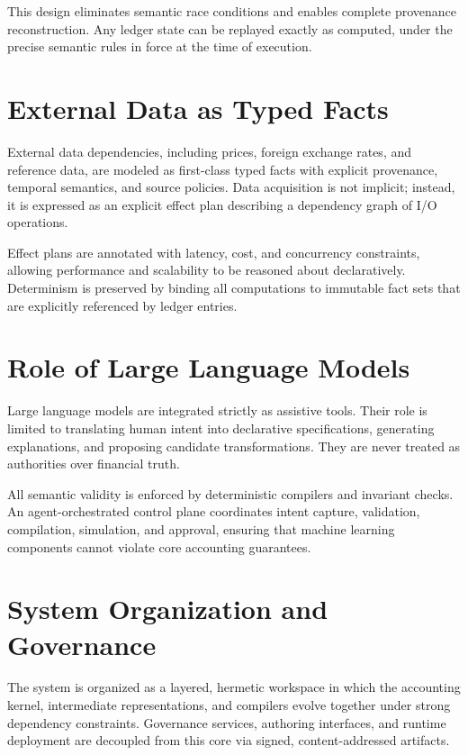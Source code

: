 \documentclass[11pt]{article}
\begin{document}
This design eliminates semantic race conditions and enables complete provenance
reconstruction. Any ledger state can be replayed exactly as computed, under the precise
semantic rules in force at the time of execution.

\section{External Data as Typed Facts}

External data dependencies, including prices, foreign exchange rates, and reference
data, are modeled as first-class typed facts with explicit provenance, temporal
semantics, and source policies. Data acquisition is not implicit; instead, it is
expressed as an explicit effect plan describing a dependency graph of I/O operations.

Effect plans are annotated with latency, cost, and concurrency constraints, allowing
performance and scalability to be reasoned about declaratively. Determinism is preserved
by binding all computations to immutable fact sets that are explicitly referenced by
ledger entries.

\section{Role of Large Language Models}

Large language models are integrated strictly as assistive tools. Their role is limited
to translating human intent into declarative specifications, generating explanations,
and proposing candidate transformations. They are never treated as authorities over
financial truth.

All semantic validity is enforced by deterministic compilers and invariant checks.
An agent-orchestrated control plane coordinates intent capture, validation, compilation,
simulation, and approval, ensuring that machine learning components cannot violate core
accounting guarantees.

\section{System Organization and Governance}

The system is organized as a layered, hermetic workspace in which the accounting kernel,
intermediate representations, and compilers evolve together under strong dependency
constraints. Governance services, authoring interfaces, and runtime deployment are
decoupled from this core via signed, content-addressed artifacts.
\end{document}
